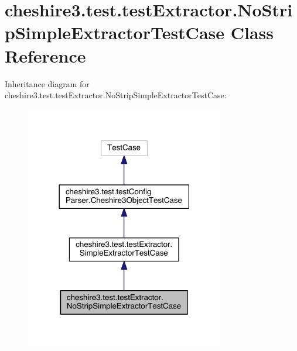 \hypertarget{classcheshire3_1_1test_1_1test_extractor_1_1_no_strip_simple_extractor_test_case}{\section{cheshire3.\-test.\-test\-Extractor.\-No\-Strip\-Simple\-Extractor\-Test\-Case Class Reference}
\label{classcheshire3_1_1test_1_1test_extractor_1_1_no_strip_simple_extractor_test_case}
}


Inheritance diagram for cheshire3.\-test.\-test\-Extractor.\-No\-Strip\-Simple\-Extractor\-Test\-Case\-:
\nopagebreak
\begin{figure}[H]
\begin{center}
\leavevmode
\includegraphics[width=246pt]{classcheshire3_1_1test_1_1test_extractor_1_1_no_strip_simple_extractor_test_case__inherit__graph}
\end{center}
\end{figure}


